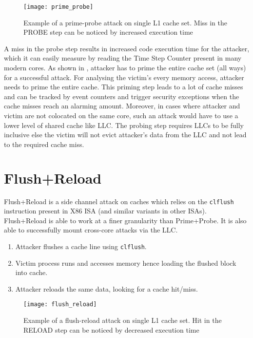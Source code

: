 \begin{figure}[h]
\texttt{[image: prime\_probe]}
\caption[Prime Probe attack]{Example of a prime-probe attack on single L1 cache set.
    Miss in the PROBE step can be noticed by increased execution time}
\label{fig:pp}
\end{figure}

A miss in the probe step results in increased code execution time for the attacker,
which it can easily measure by reading the Time Step Counter present in many
modern cores. As shown in , attacker has to prime the entire
cache set (all ways) for a successful attack. For analysing the victim's every
memory access, attacker needs to prime the entire cache. This priming step
leads to a lot of cache misses and can be tracked by event counters and
trigger security exceptions when the cache misses reach an alarming amount.
Moreover, in cases where attacker and victim are not colocated on the same
core, such an attack would have to use a lower level of shared cache like LLC.
The probing step requires LLCs to be fully inclusive else the victim will not
evict attacker's data from the LLC and not lead to the required cache miss.

\section{Flush+Reload}

Flush+Reload is a side channel attack on caches which relies on the
\texttt{clflush} instruction present in X86 ISA (and similar variants in other
ISAs). Flush+Reload is able to work at a finer granularity than Prime+Probe.
It is also able to successfully mount cross-core attacks via the LLC.

\begin{enumerate}
\item Attacker flushes a cache line using \texttt{clflush}.
\item Victim process runs and accesses memory hence loading the flushed block
    into cache.
\item Attacker reloads the same data, looking for a cache hit/miss.
\end{enumerate}

\begin{figure}[h]
\texttt{[image: flush\_reload]}
\caption[Flush Reload attack]{Example of a flush-reload attack on single L1
    cache set. Hit in the RELOAD step can be noticed by decreased execution time}
\label{fig:fr}
\end{figure}

